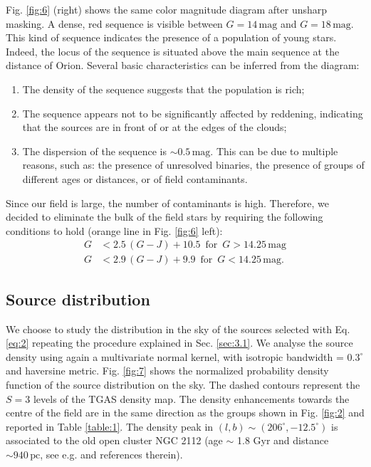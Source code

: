 \documentclass[onecolumn]{aa} %
\begin{document}
Fig. \ref{fig:6} (right) shows the same color magnitude diagram after unsharp masking. A dense, red sequence is visible between $G = 14 \, \mathrm{mag}$ and $G = 18 \, \mathrm{mag}$. This kind of sequence \citep[also reported for example by][]{Alves2012} indicates the presence of a population of young stars. Indeed, the locus of the sequence is situated above the main sequence at the distance of Orion. 
Several basic characteristics can be inferred from the diagram: 
\begin{enumerate}
\item The density of the sequence suggests that the population is rich;
\item The sequence appears not to be significantly affected by reddening, indicating that the sources are in front of or at the edges of the clouds;
\item The dispersion of the sequence is $\sim 0.5 \,\mathrm{mag}$.
This can be due to multiple reasons, such as: the presence of unresolved binaries, the presence of groups of different ages or distances, or of field contaminants.
\end{enumerate}
Since our field is large, the number of contaminants is high. Therefore, we decided to eliminate the bulk of the field stars by requiring the following conditions to hold (orange line in Fig. \ref{fig:6} left):
\begin{align}\label{eq:2}
G &< 2.5\,(G-J) + 10.5 \,\,\, \mathrm{for} \,\,\, G > 14.25 \, \mathrm{mag}\nonumber \\ 
G &< 2.9\,(G-J) + 9.9 \,\,\, \mathrm{for} \,\,\, G < 14.25	 \, \mathrm{mag}.
\end{align}



\subsection{Source distribution}\label{sec:3.3}
We choose to study the distribution in the sky of the sources selected with Eq. \eqref{eq:2} repeating the procedure explained in Sec. \ref{sec:3.1}. 
We analyse the source density using again a multivariate normal kernel, with isotropic  bandwidth =  $0.3^{\circ}$ and haversine metric.
Fig. \ref{fig:7} shows the normalized probability density function of the source distribution on the sky. The dashed contours represent the $S = 3$ levels of the TGAS density map. The density enhancements towards the centre of the field  are in the same direction as the groups shown in Fig. \ref{fig:2} and reported in Table \ref{table:1}. 
The density peak in $(l, b) \sim (206^{\circ}, -12.5^{\circ})$ is associated to the old open cluster NGC 2112 (age $\sim$ 1.8 Gyr and distance $\sim 940 \, \mathrm{pc}$, see e.g. \citet{Carraro2008} and references therein).
\end{document}
